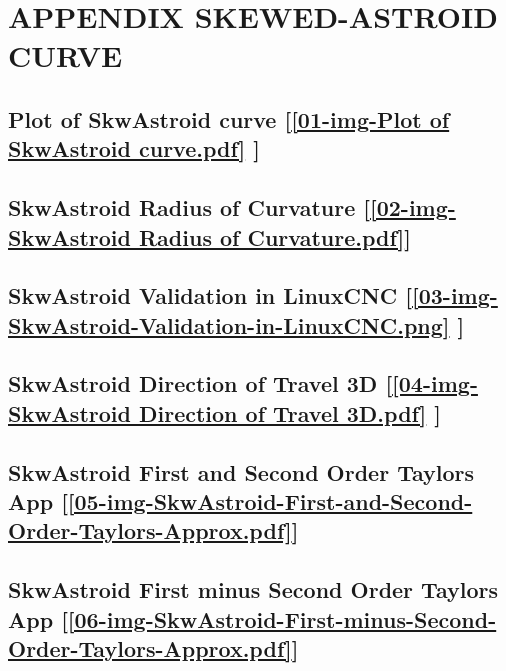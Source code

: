 \section{\textbf{APPENDIX SKEWED-ASTROID CURVE}} \label{APPENDIX SKEWED-ASTROID CURVE}



\subsection       {Plot of SkwAstroid curve
	[\ref  {01-img-Plot of SkwAstroid curve.pdf} ] }
\label{ssec-01-img-Plot of SkwAstroid curve.pdf}

\subsection       {SkwAstroid Radius of Curvature
	[\ref      {02-img-SkwAstroid Radius of Curvature.pdf}] }
\label{ssec-02-img-SkwAstroid Radius of Curvature.pdf}

\subsection       {SkwAstroid Validation in LinuxCNC
	[\ref      {03-img-SkwAstroid-Validation-in-LinuxCNC.png} ] }
\label{ssec-03-img-SkwAstroid-Validation-in-LinuxCNC.png}

\subsection     {SkwAstroid Direction of Travel 3D
	[\ref      {04-img-SkwAstroid Direction of Travel 3D.pdf} ] }
\label{ssec-04-img-SkwAstroid Direction of Travel 3D.pdf}

\subsection       {SkwAstroid First and Second Order Taylors App
	[\ref      {05-img-SkwAstroid-First-and-Second-Order-Taylors-Approx.pdf}] }
\label{ssec-05-img-SkwAstroid-First-and-Second-Order-Taylors-Approx.pdf}

\subsection       {SkwAstroid First minus Second Order Taylors App
	[\ref      {06-img-SkwAstroid-First-minus-Second-Order-Taylors-Approx.pdf}] }
\label{ssec-06-img-SkwAstroid-First-minus-Second-Order-Taylors-Approx.pdf}

